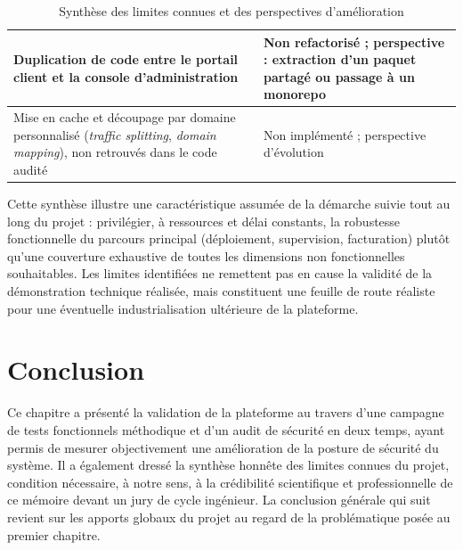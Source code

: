 \begin{table}[!ht]
\begin{center}
\begin{tabular}{|p{6.5cm}|p{7cm}|}
     \hline
     Duplication de code entre le portail client et la console d'administration & Non refactorisé ; perspective : extraction d'un paquet partagé ou passage à un monorepo \\
     \hline
     Mise en cache et découpage par domaine personnalisé (\textit{traffic splitting}, \textit{domain mapping}), non retrouvés dans le code audité & Non implémenté ; perspective d'évolution \\
     \hline
     \end{tabular}
     \caption{Synthèse des limites connues et des perspectives d'amélioration}
     \label{tab:limites}
     \end{center}
\end{table}

Cette synthèse illustre une caractéristique assumée de la démarche suivie tout au long du projet : privilégier, à ressources et délai constants, la robustesse fonctionnelle du parcours principal (déploiement, supervision, facturation) plutôt qu'une couverture exhaustive de toutes les dimensions non fonctionnelles souhaitables. Les limites identifiées ne remettent pas en cause la validité de la démonstration technique réalisée, mais constituent une feuille de route réaliste pour une éventuelle industrialisation ultérieure de la plateforme.


\section{Conclusion}

Ce chapitre a présenté la validation de la plateforme au travers d'une campagne de tests fonctionnels méthodique et d'un audit de sécurité en deux temps, ayant permis de mesurer objectivement une amélioration de la posture de sécurité du système. Il a également dressé la synthèse honnête des limites connues du projet, condition nécessaire, à notre sens, à la crédibilité scientifique et professionnelle de ce mémoire devant un jury de cycle ingénieur. La conclusion générale qui suit revient sur les apports globaux du projet au regard de la problématique posée au premier chapitre.
